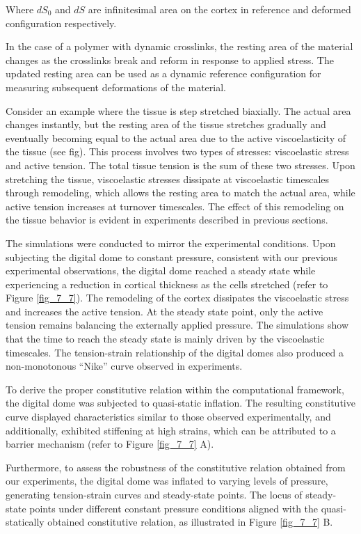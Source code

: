 Where $dS_{0}$ and $dS$ are infinitesimal area on the cortex in
reference and deformed configuration respectively.

In the case of a polymer with dynamic crosslinks, the resting area of the material changes as the crosslinks break and reform in response to applied stress. The updated resting area can be used as a dynamic reference configuration for measuring subsequent deformations of the material.

Consider an example where the tissue is step stretched biaxially. The actual area changes instantly, but the resting area of the tissue stretches gradually and eventually becoming equal to the actual area due to the active viscoelasticity of the tissue (see fig). This process involves two types of stresses: viscoelastic stress and active tension. The total tissue tension is the sum of these two stresses. Upon stretching the tissue, viscoelastic stresses dissipate at viscoelastic timescales through remodeling, which allows the resting area to match the actual area, while active tension increases at turnover timescales. The effect of this remodeling on the tissue behavior is evident in experiments described in previous sections.

The simulations were conducted to mirror the experimental conditions.
Upon subjecting the digital dome to constant pressure, consistent with
our previous experimental observations, the digital dome reached a
steady state while experiencing a reduction in cortical thickness as the
cells stretched (refer to Figure \ref{fig_7_7}). The
remodeling of the cortex dissipates the viscoelastic stress and
increases the active tension. At the steady state point, only the active
tension remains balancing the externally applied pressure. The
simulations show that the time to reach the steady state is mainly
driven by the viscoelastic timescales. The tension-strain relationship
of the digital domes also produced a non-monotonous ``Nike'' curve
observed in experiments.


To derive the proper constitutive relation within the computational
framework, the digital dome was subjected to quasi-static inflation. The
resulting constitutive curve displayed characteristics similar to those
observed experimentally, and additionally, exhibited stiffening at high
strains, which can be attributed to a barrier mechanism  (refer to Figure \ref{fig_7_7} A).

Furthermore, to assess the robustness of the constitutive relation
obtained from our experiments, the digital dome was inflated to varying
levels of pressure, generating tension-strain curves and steady-state
points. The locus of steady-state points under different constant
pressure conditions aligned with the quasi-statically obtained
constitutive relation, as illustrated in Figure \ref{fig_7_7} B.


